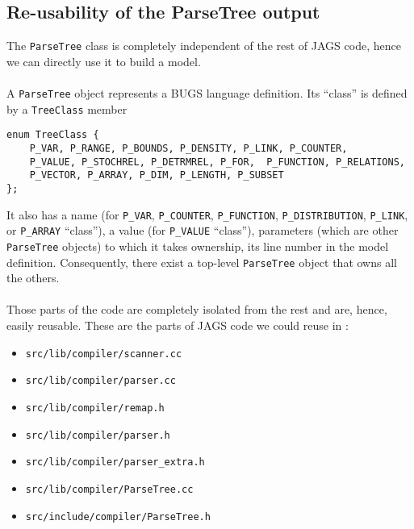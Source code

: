 \subsection{Re-usability of the ParseTree output}
The \texttt{ParseTree} class is completely independent of the rest of JAGS code, hence we can directly use it to build a \biips{} model.

\paragraph{}
A \texttt{ParseTree} object represents a BUGS language definition. Its \textquotedblleft class\textquotedblright{} is defined by a \texttt{TreeClass} member
\begin{lstlisting}
enum TreeClass { 
    P_VAR, P_RANGE, P_BOUNDS, P_DENSITY, P_LINK, P_COUNTER, 
    P_VALUE, P_STOCHREL, P_DETRMREL, P_FOR,  P_FUNCTION, P_RELATIONS,
    P_VECTOR, P_ARRAY, P_DIM, P_LENGTH, P_SUBSET
};
\end{lstlisting}

It also has a name (for \verb=P_VAR=, \verb=P_COUNTER=, \verb=P_FUNCTION=, \verb=P_DISTRIBUTION=, \verb=P_LINK=, or \verb=P_ARRAY= \textquotedblleft class\textquotedblright{}), a value (for  \verb=P_VALUE= \textquotedblleft class\textquotedblright{}), parameters (which are other \texttt{ParseTree} objects) to which it takes ownership, its line number in the model definition. Consequently, there exist a top-level \texttt{ParseTree} object that owns all the others.

\paragraph{}
Those parts of the code are completely isolated from the rest and are, hence, easily reusable. These are the parts of JAGS code we could reuse in \biips{}:
\begin{itemize}
 \item \texttt{src/lib/compiler/scanner.cc}
 \item \texttt{src/lib/compiler/parser.cc}
 \item \texttt{src/lib/compiler/remap.h}
 \item \texttt{src/lib/compiler/parser.h}
 \item \texttt{src/lib/compiler/parser\_extra.h}
 \item \texttt{src/lib/compiler/ParseTree.cc}
 \item \texttt{src/include/compiler/ParseTree.h}
\end{itemize} 

